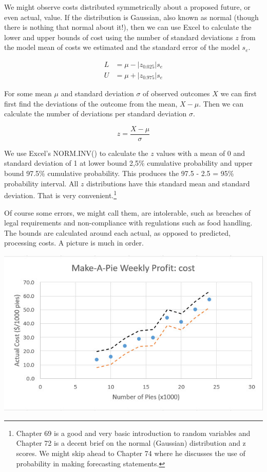 \documentclass[
]{book}
\begin{document}
We might observe costs distributed symmetrically about a proposed future, or even actual, value. If the distribution is Gaussian, also known as normal (though there is nothing that normal about it!), then we can use Excel to calculate the lower and upper bounds of cost using the number of standard deviations \(z\) from the model mean of costs we estimated and the standard error of the model \(s_e\).

\[
\begin{align}
L &= \mu - |z_{0.025}|s_e \\
U &= \mu + |z_{0.975}|s_e
\end{align}
\]

For some mean \(\mu\) and standard deviation \(\sigma\) of observed outcomes \(X\) we can first first find the deviations of the outcome from the mean, \(X-\mu\). Then we can calculate the number of deviations per standard deviation \(\sigma\).

\[
z = \frac{X-\mu}{\sigma}
\]

We use Excel's NORM.INV() to calculate the \(z\) values with a mean of 0 and standard deviation of 1 at lower bound 2,5\% cumulative probability and upper bound 97.5\% cumulative probability. This produces the 97.5 - 2.5 = 95\% probability interval. All \(z\) distributions have this standard mean and standard deviation. That is very convenient.\footnote{\citet{Winston2019} Chapter 69 is a good and very basic introduction to random variables and Chapter 72 is a decent brief on the normal (Gaussian) distribution and z scores. We might skip ahead to Chapter 74 where he discusses the use of probability in making forecasting statements.}

Of course some errors, we might call them, are intolerable, such as breaches of legal requirements and non-compliance with regulations such as food handling. The bounds are calculated around each actual, as opposed to predicted, processing costs. A picture is much in order.

\includegraphics{images/02/pie-cost-plot-lb-ub.jpg}
\end{document}
